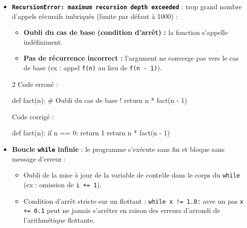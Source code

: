 \documentclass[11pt,a4paper]{article}
\begin{document}
\begin{tcolorbox}[left=0cm,title=\bf{\faBug \; 8. Récursion et boucles infinies (RecursionError et terminaison)},colbacktitle=cfond]
\begin{itemize}
	\item[\textbullet] \textbf{\texttt{RecursionError: maximum recursion depth exceeded}} : trop grand nombre d'appels récursifs imbriqués (limite par défaut à 1000) :
	\begin{itemize}
		\item[\ding{226}] \textbf{Oubli du cas de base (condition d'arrêt) :} la fonction s'appelle indéfiniment.
		\item[\ding{226}] \textbf{Pas de récurrence incorrect :} l'argument ne converge pas vers le cas de base (ex : appel \texttt{f(n)} au lieu de \texttt{f(n - 1)}).
	\end{itemize}
	\setlength{\multicolsep}{0pt}
	\begin{multicols}{2}
		\textcolor{BrickRed}{\faTimesCircle \; Code erroné :}
		\begin{python}
def fact(n):
    # Oubli du cas de base !
    return n * fact(n - 1)
		\end{python}
		\textcolor{OliveGreen}{\faCheckCircle \; Code corrigé :}
		\begin{python}
def fact(n):
    if n == 0:
        return 1
    return n * fact(n - 1)
		\end{python}
	\end{multicols}

	\item[\textbullet] \textbf{Boucle \texttt{while} infinie} : le programme s'exécute sans fin et bloque sans message d'erreur :
	\begin{itemize}
		\item[\ding{226}] Oubli de la mise à jour de la variable de contrôle dans le corps du \texttt{while} (ex : omission de \texttt{i += 1}).
		\item[\ding{226}] Condition d'arrêt stricte sur un flottant : \texttt{while x != 1.0:} avec un pas \texttt{x += 0.1} peut ne jamais s'arrêter en raison des erreurs d'arrondi de l'arithmétique flottante.
	\end{itemize}
\end{itemize}
\end{tcolorbox}
\end{document}
